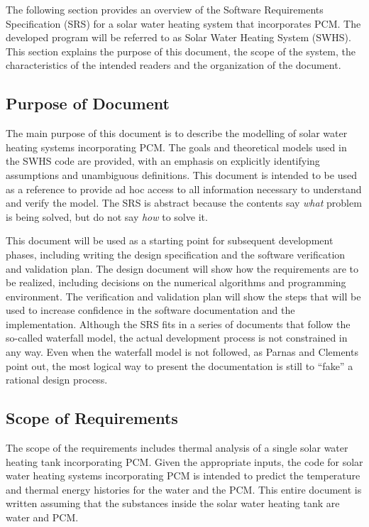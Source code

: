 \documentclass[12pt]{article}
\newcommand{\progname}{SWHS}
\begin{document}
The following section provides an overview of the Software Requirements
Specification (SRS) for a solar water heating system that incorporates PCM.  The
developed program will be referred to as Solar Water Heating System
(\progname{}).  This section explains the purpose of this document, the scope of
the system, the characteristics of the intended readers and the organization of
the document.

\subsection{Purpose of Document}

The main purpose of this document is to describe the modelling of solar water
heating systems incorporating PCM.  The goals and theoretical models used in the 
\progname{} code are provided, with an emphasis on explicitly identifying 
assumptions and unambiguous definitions.  This document is intended to be used 
as a reference to provide ad hoc access to all information necessary to 
understand and verify the model.  The SRS is abstract because the contents say
\emph{what} problem is being solved, but do not say \emph{how} to solve it.

This document will be used as a starting point for subsequent development
phases, including writing the design specification and the software verification
and validation plan.  The design document will show how the requirements are to
be realized, including decisions on the numerical algorithms and programming
environment.  The verification and validation plan will show the steps that will
be used to increase confidence in the software documentation and the
implementation.  Although the SRS fits in a series of documents that follow the
so-called waterfall model, the actual development process is not constrained in
any way.  Even when the waterfall model is not followed, as Parnas and
Clements~\cite{ParnasAndClements1986} point out, the most logical way to present
the documentation is still to ``fake'' a rational design process.

\subsection{Scope of Requirements} 

The scope of the requirements includes thermal analysis of a single solar water
heating tank incorporating PCM. Given the appropriate inputs, the code for solar
water heating systems incorporating PCM is intended to predict the temperature
and thermal energy histories for the water and the PCM. This entire document is
written assuming that the substances inside the solar water heating tank are
water and PCM.
\end{document}
